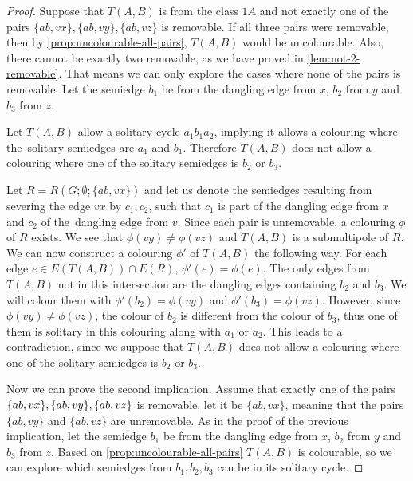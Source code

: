 \begin{proof}
	Suppose that $T(A,B)$ is from the class $1A$ and not exactly one of the pairs $\{ab,vx\}, \{ab,vy\}, \{ab,vz\}$ is removable. If all three pairs were removable, then by \cref{prop:uncolourable-all-pairs}, $T(A,B)$ would be uncolourable. Also, there cannot be exactly two removable, as we have proved in \cref{lem:not-2-removable}. That means we can only explore the cases where none of the pairs is removable. Let the semiedge $b_1$ be from the dangling edge from $x$, $b_2$ from $y$ and $b_3$ from $z$.
	
	Let $T(A,B)$ allow a solitary cycle $a_1b_1a_2$, implying it allows a colouring where the~solitary semiedges are $a_1$ and $b_1$. Therefore $T(A,B)$ does not allow a colouring where one of the solitary semiedges is $b_2$ or $b_3$.
	
	Let $R=R(G;\emptyset;\{ab,vx\})$ and let us denote the semiedges resulting from severing the edge $vx$ by $c_1,c_2$, such that $c_1$ is part of the dangling edge from $x$ and $c_2$ of the~dangling edge from $v$. Since each pair is unremovable, a colouring $\phi$ of $R$ exists. We see that $\phi(vy)\neq \phi(vz)$ and $T(A,B)$ is a submultipole of $R$. We can now construct a colouring $\phi'$ of $T(A,B)$ the following way. For each edge $e\in E(T(A,B))\cap E(R)$, $\phi'(e)=\phi(e)$. The only edges from $T(A,B)$ not in this intersection are the dangling edges containing $b_2$ and $b_3$. We will colour them with $\phi'(b_2)=\phi(vy)$ and $\phi'(b_3)=\phi(vz)$. However, since $\phi(vy)\neq \phi(vz)$, the colour of $b_2$ is different from the colour of $b_3$, thus one of them is solitary in this colouring along with $a_1$ or $a_2$. This leads to a contradiction, since we suppose that $T(A,B)$ does not allow a colouring where one of the solitary semiedges is $b_2$ or $b_3$.
	
	Now we can prove the second implication. Assume that exactly one of the pairs $\{ab,vx\}, \{ab,vy\},\newline \{ab,vz\}$ is removable, let it be $\{ab,vx\}$, meaning that the pairs $\{ab,vy\}$ and $\{ab,vz\}$ are unremovable. As in the proof of the previous implication, let the semiedge $b_1$ be from the dangling edge from $x$, $b_2$ from $y$ and $b_3$ from $z$. Based on \cref{prop:uncolourable-all-pairs} $T(A,B)$ is colourable, so we can explore which semiedges from $b_1,b_2,b_3$ can be in its solitary cycle.
	

\end{proof}
